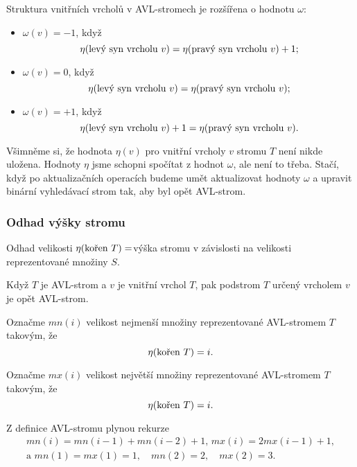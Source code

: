 \documentclass[a4paper,12pt]{article}
\newenvironment{pitemize}{
 \begin{itemize}
   \setlength{\itemsep}{1pt}
   \setlength{\parskip}{0pt}
   \setlength{\parsep}{0pt}
 }{\end{itemize}}
\begin{document}
 

Struktura vnitřních vrcholů v 
AVL-stromech je rozšířena o hodnotu $\omega$:
\begin{pitemize} 
\item $\omega (v)=-1$, když 
$$\eta (\text{\rm levý syn vrcholu }v)=\eta (\text{\rm pravý syn vrcholu }
v)+1;$$
\item $\omega (v)=0$, když 
$$\eta (\text{\rm levý syn vrcholu }v)=\eta (\text{\rm pravý syn vrcholu }
v);$$
\item $\omega (v)=+1$, když
$$\eta (\text{\rm levý syn vrcholu }v)+1=\eta (\text{\rm pravý syn vrcholu }
v).$$
\end{pitemize}

Všimněme si, že hodnota $\eta (v)$ pro vnitřní vrcholy 
$v$ stromu $T$ není nikde uložena.  Hodnoty $\eta$ jsme schopni 
spočítat z hodnot $\omega$, ale není to třeba.  Stačí, když po 
aktualizačních operacích budeme umět aktualizovat 
hodnoty $\omega$ a upravit binární vy\-hledávací strom tak, 
aby byl opět AVL-strom.

\subsubsection{Odhad výšky stromu}


Odhad velikosti $\eta (\text{\rm kořen }T)=$výška stromu v závislosti na 
velikosti reprezentované množiny $S$.
\begin{pozorovani} 
Když $T$ je AVL-strom a $v$ je vnitřní vrchol $T$, pak 
podstrom $T$ určený vrcholem $v$ je opět AVL-strom. 
\end{pozorovani}

\begin{definice}
Označme
$mn(i)$ velikost nejmenší množiny reprezentované 
AVL-stromem $T$ takovým, že $$\eta (\text{\rm kořen }T)=i.$$
\end{definice}

\begin{definice}
Označme $mx(i)$ velikost největší množiny reprezentované 
AVL-stromem $T$ takovým, že $$\eta (\text{\rm kořen }T)=i.$$ 
\end{definice}
\begin{pozorovani}
Z definice AVL-stromu plynou rekurze
\begin{gather*} mn(i)=mn(i-1)+mn(i-2)+1,\,mx(i)=2mx(i-1)+1,\\
\text{a }mn(1)=mx(1)=1,\quad mn(2)=2,\quad mx(2)=3.\end{gather*}
\end{pozorovani}
\end{document}
